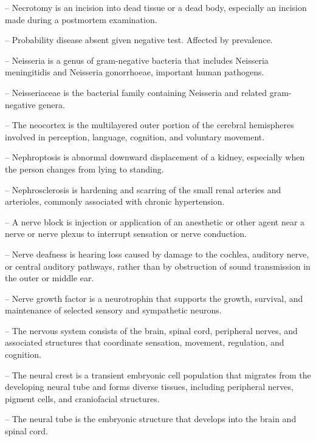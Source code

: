 -- Necrotomy is an incision into dead tissue or a dead body, especially an incision made during a postmortem examination.

-- Probability disease absent given negative test. Affected by prevalence.

-- Neisseria is a genus of gram-negative bacteria that includes Neisseria meningitidis and Neisseria gonorrhoeae, important human pathogens.

-- Neisseriaceae is the bacterial family containing Neisseria and related gram-negative genera.

-- The neocortex is the multilayered outer portion of the cerebral hemispheres involved in perception, language, cognition, and voluntary movement.

-- Nephroptosis is abnormal downward displacement of a kidney, especially when the person changes from lying to standing.

-- Nephrosclerosis is hardening and scarring of the small renal arteries and arterioles, commonly associated with chronic hypertension.

-- A nerve block is injection or application of an anesthetic or other agent near a nerve or nerve plexus to interrupt sensation or nerve conduction.

-- Nerve deafness is hearing loss caused by damage to the cochlea, auditory nerve, or central auditory pathways, rather than by obstruction of sound transmission in the outer or middle ear.

-- Nerve growth factor is a neurotrophin that supports the growth, survival, and maintenance of selected sensory and sympathetic neurons.

-- The nervous system consists of the brain, spinal cord, peripheral nerves, and associated structures that coordinate sensation, movement, regulation, and cognition.

-- The neural crest is a transient embryonic cell population that migrates from the developing neural tube and forms diverse tissues, including peripheral nerves, pigment cells, and craniofacial structures.

-- The neural tube is the embryonic structure that develops into the brain and spinal cord.

